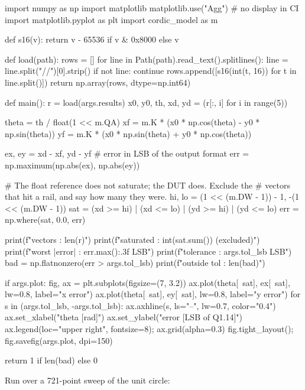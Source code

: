 \begin{pycode}[caption={Post-processing and plotting
(\file{check\_results.py}).},label={lst:python:check}]
import numpy as np
import matplotlib
matplotlib.use("Agg")            # no display in CI
import matplotlib.pyplot as plt
import cordic_model as m

def s16(v):
    return v - 65536 if v & 0x8000 else v

def load(path):
    rows = []
    for line in Path(path).read_text().splitlines():
        line = line.split("//")[0].strip()
        if not line:
            continue
        rows.append([s16(int(t, 16)) for t in line.split()])
    return np.array(rows, dtype=np.int64)

def main():
    r = load(args.results)
    x0, y0, th, xd, yd = (r[:, i] for i in range(5))

    theta = th / float(1 << m.QA)
    xf = m.K * (x0 * np.cos(theta) - y0 * np.sin(theta))
    yf = m.K * (x0 * np.sin(theta) + y0 * np.cos(theta))

    ex, ey = xd - xf, yd - yf            # error in LSB of the output format
    err = np.maximum(np.abs(ex), np.abs(ey))

    # The float reference does not saturate; the DUT does.  Exclude the
    # vectors that hit a rail, and say how many they were.
    hi, lo = (1 << (m.DW - 1)) - 1, -(1 << (m.DW - 1))
    sat = (xd >= hi) | (xd <= lo) | (yd >= hi) | (yd <= lo)
    err = np.where(sat, 0.0, err)

    print(f"vectors        : {len(r)}")
    print(f"saturated      : {int(sat.sum())} (excluded)")
    print(f"worst |error|  : {err.max():.3f} LSB")
    print(f"tolerance      : {args.tol_lsb} LSB")
    bad = np.flatnonzero(err > args.tol_lsb)
    print(f"outside tol    : {len(bad)}")

    if args.plot:
        fig, ax = plt.subplots(figsize=(7, 3.2))
        ax.plot(theta[~sat], ex[~sat], lw=0.8, label="x error")
        ax.plot(theta[~sat], ey[~sat], lw=0.8, label="y error")
        for s in (args.tol_lsb, -args.tol_lsb):
            ax.axhline(s, ls="--", lw=0.7, color="0.4")
        ax.set_xlabel("theta [rad]")
        ax.set_ylabel("error [LSB of Q1.14]")
        ax.legend(loc="upper right", fontsize=8); ax.grid(alpha=0.3)
        fig.tight_layout(); fig.savefig(args.plot, dpi=150)

    return 1 if len(bad) else 0
\end{pycode}

Run over a 721-point sweep of the unit circle:

